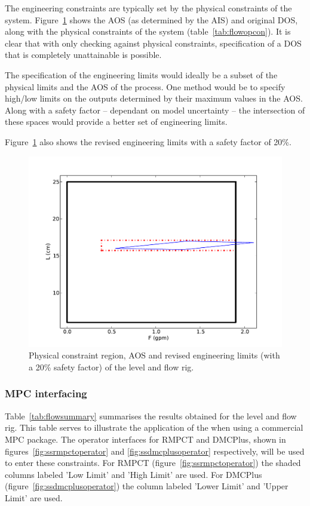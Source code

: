 The engineering constraints are typically set by the physical constraints of the system.
Figure~\ref{fig:flowcontypes} shows the AOS (as determined by the AIS) and original DOS, along with the physical constraints of the system (table~\ref{tab:flowopcon}).
It is clear that with only checking against physical constraints, specification of a DOS that is completely unattainable is possible.

The specification of the engineering limits would ideally be a subset of the physical limits and the AOS of the process.
One method would be to specify high/low limits on the outputs determined by their maximum values in the AOS.
Along with a safety factor -- dependant on model uncertainty -- the intersection of these spaces would provide a better set of engineering limits.

Figure~\ref{fig:flowcontypes} also shows the revised engineering limits with a safety factor of 20\%.

\begin{figure}[htbp]
  \centering
    \includegraphics[width=\fullwidth]{graph/flowcontypes.pdf}
  \caption[Physical constraint region of level and flow rig]{Physical constraint region, AOS and revised engineering limits (with a 20\% safety factor) of the level and flow rig.}
  \label{fig:flowcontypes}
\end{figure}

\subsubsection{MPC interfacing}
Table~\ref{tab:flowsummary} summarises the results obtained for the level and flow rig.
This table serves to illustrate the application of the when using a commercial MPC package.
The operator interfaces for RMPCT and DMCPlus, shown in figures~\ref{fig:ssrmpctoperator} and \ref{fig:ssdmcplusoperator} respectively, will be used to enter these constraints.
For RMPCT (figure~\ref{fig:ssrmpctoperator}) the shaded columns labeled 'Low Limit' and 'High Limit' are used.
For DMCPlus (figure~\ref{fig:ssdmcplusoperator}) the column labeled 'Lower Limit' and 'Upper Limit' are used.

